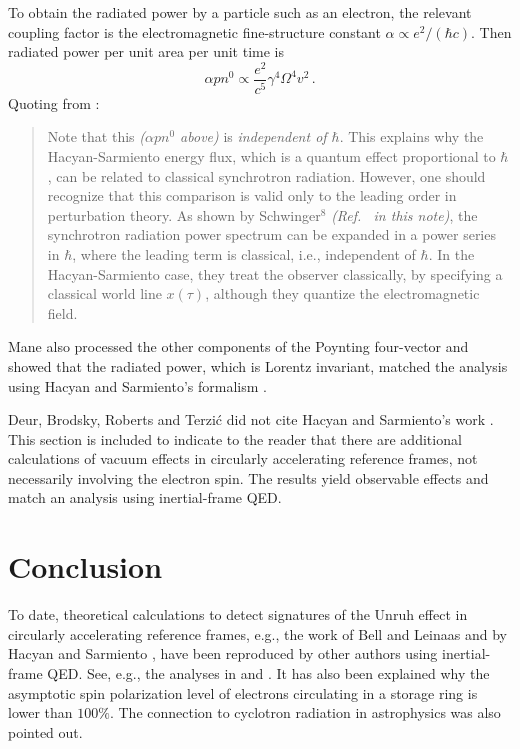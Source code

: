 \documentclass[review]{elsarticle}
\theoremstyle{plain}
\begin{document}
To obtain the radiated power by a particle such as an electron,
the relevant coupling factor is the electromagnetic fine-structure constant $\alpha \propto e^2/(\hbar c)$.
Then radiated power per unit area per unit time is
\begin{equation}
\label{eq:Mane_comment_eq3}
\alpha pn^0 \propto \frac{e^2}{c^5}\gamma^4\Omega^4v^2 \,.
\end{equation}
Quoting from \cite{ManeHS}:
\begin{quote}
Note that this \emph{($\alpha pn^0$ above)} is \textit{independent of $\hbar$}.
This explains why the Hacyan-Sarmiento energy flux, which is a quantum effect
proportional to $\hbar$, can be related to classical synchrotron radiation.
However, one should recognize that this comparison is valid only to the leading order in perturbation theory.
As shown by Schwinger${}^8$ \emph{(Ref.~\cite{Schwinger1954} in this note)}, the synchrotron radiation
power spectrum can be expanded in a power series in $\hbar$, where the leading term is classical, i.e., independent of $\hbar$.
In the Hacyan-Sarmiento case, they treat the observer
classically, by specifying a classical world line $x(\tau)$, although they quantize the electromagnetic field.
\end{quote}
Mane \cite{ManeHS} also processed the other components of the Poynting four-vector and showed that the radiated power, which is Lorentz invariant,
matched the analysis using Hacyan and Sarmiento's formalism \cite{HS}.

Deur, Brodsky, Roberts and Terzi{\'c} \cite{RUE} did not cite Hacyan and Sarmiento's work \cite{HS}.
This section is included to indicate to the reader that there are additional calculations of
vacuum effects in circularly accelerating reference frames, not necessarily involving the electron spin.
The results yield observable effects and match an analysis using inertial-frame QED.

\setcounter{equation}{0}
\section{Conclusion}\label{sec:conc}
To date, theoretical calculations to detect signatures of the Unruh effect in circularly accelerating reference frames,
e.g., the work of Bell and Leinaas \cite{BL1987,BL1983} and by Hacyan and Sarmiento \cite{HS}, have been reproduced by other authors using inertial-frame QED.
See, e.g., the analyses in \cite{BM} and \cite{ManeHS}.
It has also been explained why the asymptotic spin polarization level of electrons circulating in a storage ring is lower than $100\%$.
The connection to cyclotron radiation in astrophysics was also pointed out.
\end{document}

